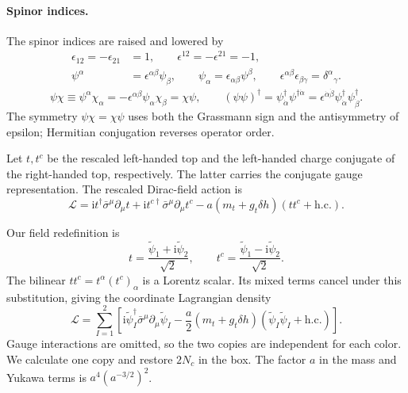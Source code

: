 \documentclass[a4paper,12pt]{article}
\newcommand{\ii}{\mathrm i}
\begin{document}
\paragraph{Spinor indices.}
\label{sec:spinor-indices}
The spinor indices are raised and lowered by
\begin{align}
 \epsilon_{12}=-\epsilon_{21}&=1,\qquad
 \epsilon^{12}=-\epsilon^{21}=-1,\nonumber\\
 \psi^\alpha&=\epsilon^{\alpha\beta}\psi_\beta,\qquad
 \psi_\alpha=\epsilon_{\alpha\beta}\psi^\beta,\qquad
 \epsilon^{\alpha\beta}\epsilon_{\beta\gamma}=\delta^\alpha{}_{\gamma}.
 \label{eq:epsilon}
\end{align}
\begin{equation}
 \psi\chi\equiv\psi^\alpha\chi_\alpha
 =-\epsilon^{\alpha\beta}\psi_\alpha\chi_\beta
 =\chi\psi,\qquad
 (\psi\psi)^\dagger
 =\psi^\dagger_{\dot\alpha}\psi^{\dagger\dot\alpha}
 =\epsilon^{\dot\alpha\dot\beta}
   \psi^\dagger_{\dot\alpha}\psi^\dagger_{\dot\beta}.
 \label{eq:spinor-bilinears}
\end{equation}
The symmetry $\psi\chi=\chi\psi$ uses both the Grassmann sign and the
antisymmetry of epsilon; Hermitian conjugation reverses operator order.

Let $t,t^c$ be the rescaled left-handed top and the left-handed charge
conjugate of the right-handed top, respectively. The latter carries the
conjugate gauge representation.
The rescaled Dirac-field action is
\begin{equation}
 \mathcal L=\ii t^\dagger\bar\sigma^\mu\partial_\mu t
 +\ii t^{c\dagger}\bar\sigma^\mu\partial_\mu t^c
 -a(m_t+g_t\delta h)(tt^c+\mathrm{h.c.}).
 \label{eq:action-dirac}
\end{equation}

Our field redefinition is
\begin{equation}
 t=\frac{\widetilde\psi_1+\ii\widetilde\psi_2}{\sqrt2},\qquad
 t^c=\frac{\widetilde\psi_1-\ii\widetilde\psi_2}{\sqrt2}.
 \label{eq:aoki-change}
\end{equation}
The bilinear $tt^c=t^\alpha(t^c)_\alpha$ is a Lorentz scalar.
Its mixed terms cancel under this substitution, giving the coordinate
Lagrangian density
\begin{equation}
 \boxed{\mathcal L=\sum_{I=1}^2\left[
 \ii\widetilde\psi_I^\dagger\bar\sigma^\mu\partial_\mu\widetilde\psi_I
 -\frac a2(m_t+g_t\delta h)(\widetilde\psi_I\widetilde\psi_I+\mathrm{h.c.})\right].}
 \label{eq:action}
\end{equation}
Gauge interactions are omitted, so the two copies are independent for
each color. We calculate one copy and restore $2N_c$ in the box.
The factor $a$ in the mass and Yukawa terms is
$a^4(a^{-3/2})^2$.
\end{document}
